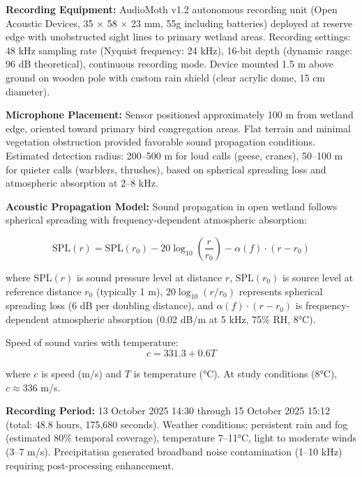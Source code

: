 \documentclass[twocolumn]{article}
\begin{document}
\textbf{Recording Equipment:} AudioMoth v1.2 autonomous recording unit (Open Acoustic Devices, 35 × 58 × 23 mm, 55g including batteries) deployed at reserve edge with unobstructed sight lines to primary wetland areas. Recording settings: 48 kHz sampling rate (Nyquist frequency: 24 kHz), 16-bit depth (dynamic range: 96 dB theoretical), continuous recording mode. Device mounted 1.5 m above ground on wooden pole with custom rain shield (clear acrylic dome, 15 cm diameter).

\textbf{Microphone Placement:} Sensor positioned approximately 100 m from wetland edge, oriented toward primary bird congregation areas. Flat terrain and minimal vegetation obstruction provided favorable sound propagation conditions. Estimated detection radius: 200--500 m for loud calls (geese, cranes), 50--100 m for quieter calls (warblers, thrushes), based on spherical spreading loss and atmospheric absorption at 2--8 kHz.

\textbf{Acoustic Propagation Model:} Sound propagation in open wetland follows spherical spreading with frequency-dependent atmospheric absorption:

\begin{equation}
\text{SPL}(r) = \text{SPL}(r_0) - 20\log_{10}\left(\frac{r}{r_0}\right) - \alpha(f) \cdot (r - r_0)
\label{eq:spherical_spreading}
\end{equation}

where $\text{SPL}(r)$ is sound pressure level at distance $r$, $\text{SPL}(r_0)$ is source level at reference distance $r_0$ (typically 1 m), $20\log_{10}(r/r_0)$ represents spherical spreading loss (6 dB per doubling distance), and $\alpha(f) \cdot (r - r_0)$ is frequency-dependent atmospheric absorption (0.02 dB/m at 5 kHz, 75\% RH, 8°C).

Speed of sound varies with temperature:
\begin{equation}
c = 331.3 + 0.6T
\label{eq:speed_of_sound}
\end{equation}

where $c$ is speed (m/s) and $T$ is temperature (°C). At study conditions (8°C), $c \approx 336$ m/s.

\textbf{Recording Period:} 13 October 2025 14:30 through 15 October 2025 15:12 (total: 48.8 hours, 175,680 seconds). Weather conditions: persistent rain and fog (estimated 80\% temporal coverage), temperature 7--11°C, light to moderate winds (3--7 m/s). Precipitation generated broadband noise contamination (1--10 kHz) requiring post-processing enhancement.
\end{document}
